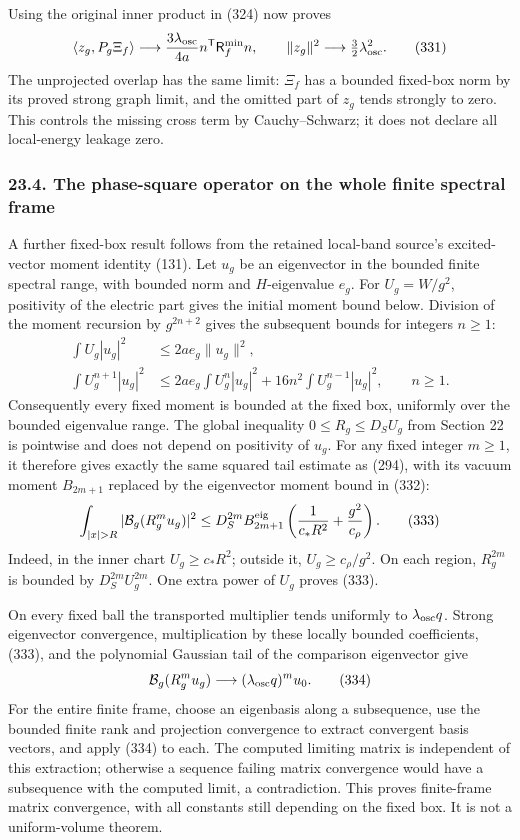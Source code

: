 \documentclass[
  11pt,
]{article}
\begin{document}
Using the original inner product in (324) now proves \[
 \langle z_g,P_g\Xi_f\rangle
 \longrightarrow\frac{3\lambda_{\rm osc}}{4a}
                  n^{\mathsf T}{\mathsf R}_f^{\min}n,\qquad
 \|z_g\|^2\longrightarrow\tfrac32\lambda_{\rm osc}^2.
 \tag{331}
\] The unprojected overlap has the same limit: \(\Xi_f\) has a bounded
fixed-box norm by its proved strong graph limit, and the omitted part of
\(z_g\) tends strongly to zero. This controls the missing cross term by
Cauchy--Schwarz; it does not declare all local-energy leakage zero.

\subsubsection{23.4. The phase-square operator on the whole finite
spectral
frame}\label{the-phase-square-operator-on-the-whole-finite-spectral-frame}

A further fixed-box result follows from the retained local-band source's
excited-vector moment identity (131). Let \(u_g\) be an eigenvector in
the bounded finite spectral range, with bounded norm and
\(H\)-eigenvalue \(e_g\). For \(U_g=W/g^2\), positivity of the electric
part gives the initial moment bound below. Division of the moment
recursion by \(g^{2n+2}\) gives the subsequent bounds for integers
\(n\ge1\): \[
 \begin{aligned}
 \int U_g|u_g|^2&\le2ae_g\|u_g\|^2,\\
 \int U_g^{n+1}|u_g|^2
 &\le2ae_g\int U_g^n|u_g|^2+
       16n^2\int U_g^{n-1}|u_g|^2,\qquad n\ge1.
 \end{aligned}
 \tag{332}
\] Consequently every fixed moment is bounded at the fixed box,
uniformly over the bounded eigenvalue range. The global inequality
\(0\le R_g\le D_SU_g\) from Section 22 is pointwise and does not depend
on positivity of \(u_g\). For any fixed integer \(m\ge1\), it therefore
gives exactly the same squared tail estimate as (294), with its vacuum
moment \(B_{2m+1}\) replaced by the eigenvector moment bound in (332):
\[
 \int_{|x|>R}|{\cal B}_g(R_g^m u_g)|^2
 \le D_S^{2m}B^{\rm eig}_{2m+1}
       \left(\frac1{c_*R^2}+\frac{g^2}{c_\rho}\right).
 \tag{333}
\] Indeed, in the inner chart \(U_g\ge c_*R^2\); outside it,
\(U_g\ge c_\rho/g^2\). On each region, \(R_g^{2m}\) is bounded by
\(D_S^{2m}U_g^{2m}\). One extra power of \(U_g\) proves (333).

On every fixed ball the transported multiplier tends uniformly to
\(\lambda_{\rm osc}q\). Strong eigenvector convergence, multiplication
by these locally bounded coefficients, (333), and the polynomial
Gaussian tail of the comparison eigenvector give \[
 {\cal B}_g(R_g^m u_g)\longrightarrow
             (\lambda_{\rm osc}q)^m u_0 .
 \tag{334}
\] For the entire finite frame, choose an eigenbasis along a
subsequence, use the bounded finite rank and projection convergence to
extract convergent basis vectors, and apply (334) to each. The computed
limiting matrix is independent of this extraction; otherwise a sequence
failing matrix convergence would have a subsequence with the computed
limit, a contradiction. This proves finite-frame matrix convergence,
with all constants still depending on the fixed box. It is not a
uniform-volume theorem.
\end{document}
